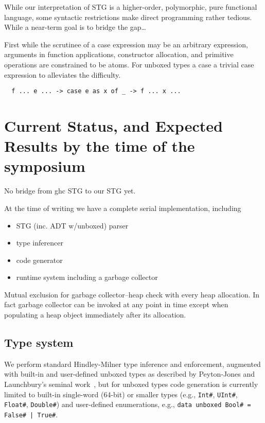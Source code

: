 \documentclass{llncs}
\begin{document}
While our interpretation of STG is a higher-order, polymorphic, pure
functional language, some syntactic restrictions make direct programming
rather tedious.  While a near-term goal is to bridge the gap\ldots

First while the scrutinee of a case expression may be an arbitrary expression,
arguments in function applications, constructor allocation, and primitive
operations are constrained to be atoms.  For unboxed types a case
a trivial case expression to alleviates
the difficulty.
\begin{verbatim}
  f ... e ... -> case e as x of _ -> f ... x ...
\end{verbatim}



\section{Current Status, and Expected Results by the time of the symposium}

No bridge from ghc STG to our STG yet.

At the time of writing we have a complete serial implementation, including
\begin{itemize}
\item STG (inc. ADT w/unboxed) parser
\item type inferencer
\item code generator
\item runtime system including a garbage collector
\end{itemize}

Mutual exclusion for garbage collector--heap check with every heap allocation.
In fact garbage collector can be invoked at any point in time except when
populating a heap object immediately after its allocation.



\subsection{Type system}

We perform standard Hindley-Milner type inference and enforcement, augmented
with built-in and user-defined unboxed types as described by Peyton-Jones and
Launchbury's seminal work~\cite{unboxed}, but for unboxed types code
generation is currently limited to built-in single-word (64-bit) or smaller
types (e.g., \texttt{Int\#}, \texttt{UInt\#}, \texttt{Float\#}, \texttt{Double\#})
and user-defined enumerations, e.g., \texttt{data unboxed Bool\# = False\# |
  True\#}.
\end{document}
